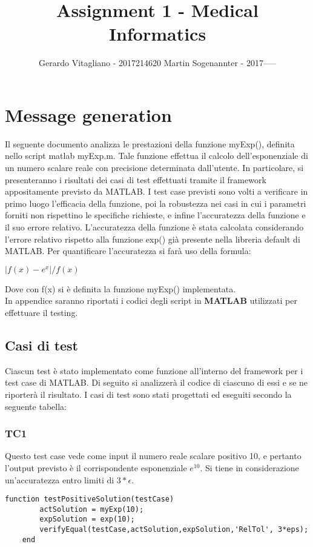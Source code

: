 \documentclass[a4paper,titlepage]{article}
\newcommand{\subtitle}[1]{%
  \posttitle{%
    \par\end{center}
    \begin{center}\large#1\end{center}
    \vskip0.5em}%
}
\begin{document}
\title{Assignment 1 - Medical Informatics}
\subtitle{Clinical message parsing}
\author{Gerardo Vitagliano - 2017214620
		Martin Sogenannter - 2017-----}
\date{\vspace{-5ex}}
\vfill
\maketitle
\clearpage
\section{Message generation}

          Il seguente documento analizza le prestazioni della funzione myExp(), definita nello script matlab myExp.m. Tale funzione effettua il calcolo
		  dell'esponenziale di un numero scalare reale con precisione determinata dall'utente.
		  In particolare, si presenteranno i risultati dei casi di test effettuati tramite il framework appositamente previsto da MATLAB.
		  I test case previsti sono volti a verificare in primo luogo l'efficacia della funzione, poi la robustezza nei casi in cui i parametri forniti
		  non rispettino le specifiche richieste, e infine l'accuratezza della funzione e il suo errore relativo.
		  		 L'accuratezza della funzione è stata calcolata considerando l'errore relativo rispetto alla funzione exp() già presente nella libreria default di MATLAB.
		 Per quantificare l'accuratezza si farà uso della formula:\\
			\centerline{$|f(x)-e^x|/f(x)$}
		 Dove con f(x) si è definita la funzione myExp() implementata.\\
		In appendice saranno riportati i codici degli script in \textbf{MATLAB} utilizzati per effettuare il testing.

		\subsection{Casi di test}
		Ciascun test è stato implementato come funzione all'interno del framework per i test case di MATLAB.
		Di seguito si analizzerà il codice di ciascuno di essi e se ne riporterà il risultato.
		I casi di test sono stati progettati ed eseguiti secondo la seguente tabella:


\subsubsection{TC1}
Questo test case vede come input il numero reale scalare positivo 10, e pertanto l'output previsto è il corrispondente esponenziale $e^{10}$.
Si tiene in considerazione un'accuratezza entro limiti di $3*\epsilon$.
\begin{lstlisting}[caption=Test Case 1]
	function testPositiveSolution(testCase)
		actSolution = myExp(10);
		expSolution = exp(10);
		verifyEqual(testCase,actSolution,expSolution,'RelTol', 3*eps);
	end
\end{lstlisting}
\end{document}
